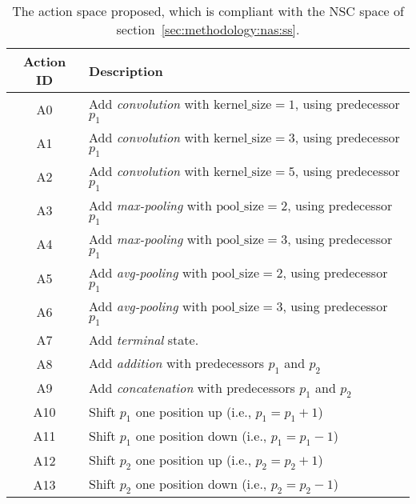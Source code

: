 \begin{table}[ht]
\centering
\begin{tabular}{@{}cl@{}}
\toprule
\textbf{Action ID} & \textbf{Description}                                                               \\ \midrule
A0                  & Add \textit{convolution} with $\text{kernel\_size}=1$, using predecessor $p_1$     \\
A1                  & Add \textit{convolution} with $\text{kernel\_size}=3$, using predecessor $p_1$     \\
A2                  & Add \textit{convolution} with $\text{kernel\_size}=5$, using predecessor $p_1$     \\
A3                  & Add \textit{max-pooling} with $\text{pool\_size}=2$, using predecessor $p_1$       \\
A4                  & Add \textit{max-pooling} with $\text{pool\_size}=3$, using predecessor $p_1$       \\
A5                  & Add \textit{avg-pooling} with $\text{pool\_size}=2$, using predecessor $p_1$       \\
A6                  & Add \textit{avg-pooling} with $\text{pool\_size}=3$, using predecessor $p_1$       \\
A7                  & Add \textit{terminal} state.                                                       \\
A8                  & Add \textit{addition} with predecessors $p_1$ and $p_2$                            \\
A9                  & Add \textit{concatenation} with predecessors $p_1$ and $p_2$                       \\
A10                 & Shift $p_1$ one position up (i.e., $p_1 = p_1 + 1$)                                                        \\
A11                 & Shift $p_1$ one position down (i.e., $p_1 = p_1 - 1$)                                                  \\
A12                 & Shift $p_2$ one position up (i.e., $p_2 = p_2 + 1$)                                                        \\
A13                 & Shift $p_2$ one position down (i.e., $p_2 = p_2 - 1$)                                                      \\ \bottomrule
\end{tabular}
\caption{The action space proposed, which is compliant with the NSC space of section~\ref{sec:methodology:nas:ss}. %
}
\label{tab:methodology:rl:as}
\end{table}


